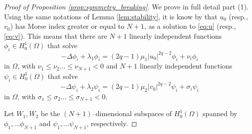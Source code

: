\documentclass[reqno]{amsart}
\begin{document}
\begin{proof}[Proof of Proposition \ref{prop:symmetry_breaking}]
We prove in full detail part (1).
Using the same notations of Lemma \ref{lem:stability}, it is know by
\cite[Theorem 1.1]{AftPac} that  $u_0$ (resp., $v_0$) has Morse index greater or
equal to $N+1$, as a solution to \eqref{eq:u} (resp., \eqref{eq:v}).
This means that there are $N+1$ linearly independent functions
$\phi_i\in H^1_0(\Omega)$  that solve
\begin{equation}\label{autofunzu}
  -\Delta \phi_i +\lambda_1\phi_i= (2q-1)\mu_1|u_0|^{2q-2}\phi_i + \nu_i \phi_i
\end{equation}
in $\Omega$, with $\nu_1\le \nu_2\dots \le\nu_{N+1}<0$ and
 $N+1$ linearly independent functions $\psi_i\in H^1_0(\Omega)$ that solve
\begin{equation}\label{autofunzv}
  -\Delta \psi_i +\lambda_2\psi_i= (2q-1)\mu_2|v_0|^{2q-2}\psi_i + \sigma_i \psi_i
\end{equation}
in $\Omega$, with $\sigma_1\le \sigma_2\dots \le\sigma_{N+1}<0$.

Let $W_1 , W_2$ be the $(N\!+\!1)$--dimensional subspaces of $H^1_0(\Omega)$ spanned  by
$\phi_1,\dots \phi_{N+1}$ and $\psi_1, \dots \psi_{N+1}$, respectively.


\end{proof}
\end{document}
